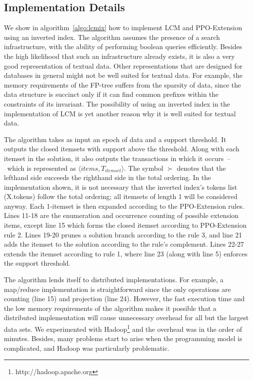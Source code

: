 \documentclass[letterpaper,12pt,titlepage,oneside,final]{book}
\begin{document}
\subsection{Implementation Details}
We show in algorithm~\ref{algo:lcmix} how to implement LCM and PPO-Extension
using an inverted index.
The algorithm assumes the presence of a search infrastructure,
with the ability of performing boolean queries efficiently.
Besides the high likelihood that such an infrastructure already exists,
it is also a very good representation of textual data.
Other representations that are designed for databases in general
might not be well suited for textual data. %
For example, the memory requirements of the FP-tree suffers from the sparsity
of data, since the data structure is succinct only if it can find common
prefixes within the constraints of its invariant. 
The possibility of using an inverted index in the implementation 
of LCM is yet another reason why it is well suited 
for textual data.

The algorithm takes as input an epoch of data and a support threshold.
It outputs the closed itemsets with support above the threshold.
Along with each itemset in the solution, it also outputs the transactions
in which it occurs~--~which is represented as $\langle items,
T_{itemset} \rangle$.
The symbol $\succ$ denotes that the lefthand side  succeeds the righthand
side in the total ordering.
In the implementation shown, it is not necessary that the inverted index's tokens  list (X.tokens)
follow the total ordering; all itemsets of length 1 will be considered anyway. 
Each 1-itemset is then expanded according to the PPO-Extension rules.
Lines 11-18 are the enumeration and occurrence counting of possible extension items, 
except line 15 which forms the closed itemset according to PPO-Extension rule 2.
Lines 19-20 prunes a solution branch according to the rule 3, 
and line 21 adds the itemset to the solution according to the rule's complement.
Lines 22-27 extends the itemset according to rule 1, 
where line 23 (along with line 5) enforces the support threshold.


The algorithm lends itself to distributed implementations.
For example, a map/reduce implementation is straightforward since the only
operations are counting (line 15) and projection (line 24).
However, the fast execution time and the low memory requirements of the
algorithm makes it possible that a distributed implementation will
cause unnecessary overhead for all but the largest data sets.
We experimented with Hadoop\footnote{http://hadoop.apache.org}
and the overhead was in the order of minutes.
Besides, many problems start to arise 
when the programming model is complicated,
and Hadoop was particularly problematic.
\end{document}
